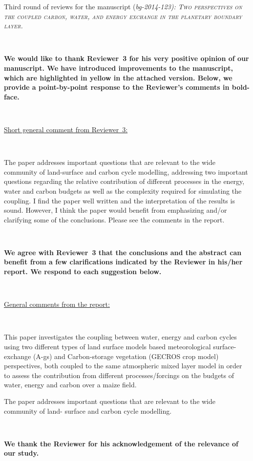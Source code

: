 \documentclass[10pt,a4paper,notitlepage,twoside]{article}
\begin{document}
\large{Third round of reviews for the manuscript (\itshape{bg-2014-123}): \scshape{Two 
perspectives on the coupled carbon, water, and energy exchange in the planetary boundary layer.}}

\normalsize

\ 

\textbf{We would like to thank Reviewer~3 for his very positive opinion of our manuscript. We have introduced improvements to the manuscript, which are highlighted in yellow in the attached version. Below, we provide a point-by-point response to the Reviewer's comments in bold-face.}

\

\underline{Short general comment from Reviewer~3:}

\

The paper addresses important questions that are relevant to the wide community of land-surface and carbon cycle modelling, addressing two important questions regarding the relative contribution of different processes in the energy, water and carbon budgets as well as the complexity required for simulating the coupling. I find the paper well written and the interpretation of the results is sound. However, I think the paper would benefit from emphasizing and/or clarifying some of the conclusions. Please see the comments in the report.

\

\textbf{We agree with Reviewer~3 that the conclusions and the abstract can benefit from a few clarifications indicated by the Reviewer in his/her report. We respond to each suggestion below.}

\ 


\underline{General comments from the report:}

\

This paper investigates the coupling between water, energy and carbon cycles using two different
types of land surface models based meteorological surface-exchange (A-gs) and Carbon-storage
vegetation (GECROS crop model) perspectives, both coupled to the same atmospheric mixed
layer model in order to assess the contribution from different processes/forcings on the budgets
of water, energy and carbon over a maize field.

The paper addresses important questions that are relevant to the wide community of land-
surface and carbon cycle modelling. 

\

\textbf{We thank the Reviewer for his acknowledgement of the relevance of our study.}
\end{document}
